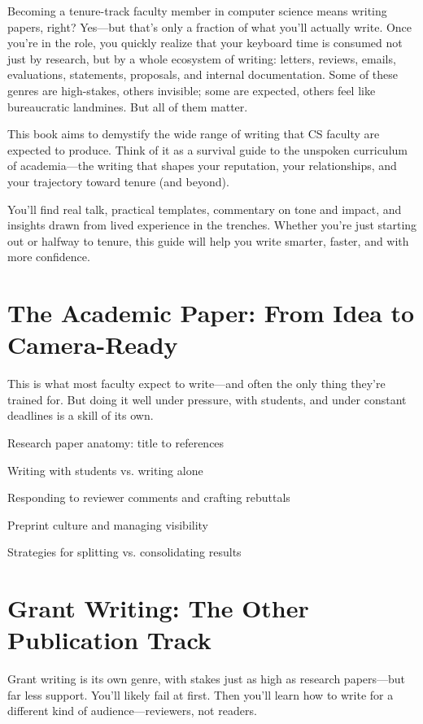 \documentclass[oneside,11pt,dvipsnames]{book}
\begin{document}
Becoming a tenure-track faculty member in computer science means writing papers, right? Yes—but that’s only a fraction of what you'll actually write. Once you're in the role, you quickly realize that your keyboard time is consumed not just by research, but by a whole ecosystem of writing: letters, reviews, emails, evaluations, statements, proposals, and internal documentation. Some of these genres are high-stakes, others invisible; some are expected, others feel like bureaucratic landmines. But all of them matter.

This book aims to demystify the wide range of writing that CS faculty are expected to produce. Think of it as a survival guide to the unspoken curriculum of academia—the writing that shapes your reputation, your relationships, and your trajectory toward tenure (and beyond).

You’ll find real talk, practical templates, commentary on tone and impact, and insights drawn from lived experience in the trenches. Whether you’re just starting out or halfway to tenure, this guide will help you write smarter, faster, and with more confidence.


\chapter{The Academic Paper: From Idea to Camera-Ready}

This is what most faculty expect to write—and often the only thing they’re trained for. But doing it well under pressure, with students, and under constant deadlines is a skill of its own.

Research paper anatomy: title to references

Writing with students vs. writing alone

Responding to reviewer comments and crafting rebuttals

Preprint culture and managing visibility

Strategies for splitting vs. consolidating results

\chapter{Grant Writing: The Other Publication Track}

Grant writing is its own genre, with stakes just as high as research papers—but far less support. You’ll likely fail at first. Then you’ll learn how to write for a different kind of audience—reviewers, not readers.
\end{document}
